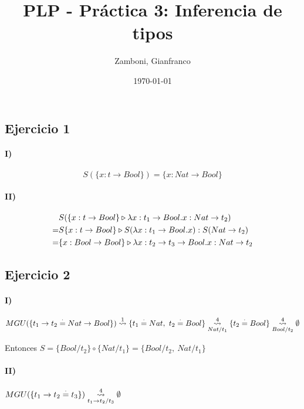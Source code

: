 \documentclass[10pt,a4paper]{article}
\begin{document}
\title{PLP - Práctica 3: Inferencia de tipos}

\date{\today}

\author{Zamboni, Gianfranco}

\maketitle
\setcounter{page}{1}

\subsection{Ejercicio 1}
\paragraph{I)} $$S(\{x:t\to Bool\}) = \{x: Nat\to Bool\}$$
\paragraph{II)} 
\begin{equation*}
\begin{split}
&S(\judgeType{\{x:t\to Bool\}}{\lambdaAbs{x}{t_1\to Bool}{x}}{Nat\to t_2}) \\
= &\judgeType{S\{x:t\to Bool\}}{S(\lambdaAbs{x}{t_1\to Bool}{x})}{S(Nat\to t_2)} \\
= &\judgeType{\{x:Bool\to Bool\}}{\lambdaAbs{x}{t_2\to t_3\to Bool}{x}}{Nat\to t_2}
\end{split}
\end{equation*}

\subsection{Ejercicio 2}
\paragraph{I)}
\begin{align*}
MGU(\{t_1\to t_2\equalDot Nat\to Bool\}) \goesTo{1}{} \{t_1\equalDot Nat,~t_2\equalDot Bool\} \goesTo{4}{Nat/t_1} \{t_2\equalDot Bool\} \goesTo{4}{Bool/t_2} \emptyset
\end{align*}

Entonces $S=\{Bool/t_2\}\circ\{Nat/t_1\} = \{Bool/t_2,~Nat/t_1\}$

\paragraph{II)}$MGU(\{t_1\to t_2\equalDot t_3\}) \goesTo{4}{t_1\to t_2/t_3} \emptyset$
\end{document}
